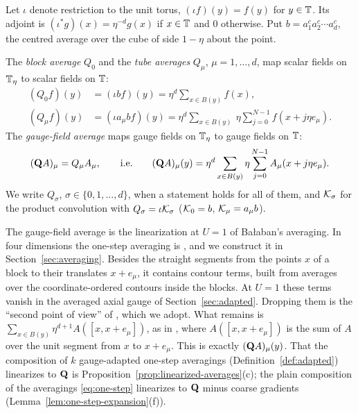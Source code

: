 Let $\iota$ denote restriction to the unit torus, $(\iota f)(y)=f(y)$ for $y\in\mathbb T$. Its adjoint is $(\iota^*g)(x)=\eta^{-d}g(x)$ if $x\in\mathbb T$ and $0$ otherwise. Put $b=a^c_1a^c_2\cdots a^c_d$, the centred average over the cube of side $1-\eta$ about the point.

\begin{definition}\label{def:averages}
The \emph{block average} $Q_0$ and the \emph{tube averages} $Q_\mu$, $\mu=1,\dots,d$, map scalar fields on $\mathbb T_\eta$ to scalar fields on $\mathbb T$:
\begin{align*}
(Q_0f)(y)&=(\iota bf)(y)=\eta^d\sum_{x\in B(y)}f(x),\\
(Q_\mu f)(y)&=(\iota a_\mu bf)(y)=\eta^d\sum_{x\in B(y)}\ \eta\sum_{j=0}^{N-1}f(x+j\eta e_\mu).
\end{align*}
The \emph{gauge-field average} maps gauge fields on $\mathbb T_\eta$ to gauge fields on $\mathbb T$:
\[
(\mathbf Q A)_\mu=Q_\mu A_\mu,\qquad\text{i.e.}\qquad (\mathbf Q A)_\mu(y)=\eta^d\sum_{x\in B(y)}\eta\sum_{j=0}^{N-1}A_\mu(x+j\eta e_\mu).
\]
We write $Q_\sigma$, $\sigma\in\{0,1,\dots,d\}$, when a statement holds for all of them, and $\mathcal K_\sigma$ for the product convolution with $Q_\sigma=\iota\mathcal K_\sigma$ ($\mathcal K_0=b$, $\mathcal K_\mu=a_\mu b$).
\end{definition}

The gauge-field average is the linearization at $U=1$ of Ba\l aban's averaging. In four dimensions the one-step averaging is \cite[(0.12)]{BalYM4I}, and we construct it in Section~\ref{sec:averaging}. Besides the straight segments from the points $x$ of a block to their translates $x+e_\mu$, it contains contour terms, built from averages over the coordinate-ordered contours inside the blocks. At $U=1$ these terms vanish in the averaged axial gauge of Section~\ref{sec:adapted}. Dropping them is the ``second point of view'' of \cite[(1.13)]{BalPropI}, which we adopt. What remains is $\sum_{x\in B(y)}\eta^{d+1}A([x,x+e_\mu])$, as in \cite[(1.11), (1.18)]{BalPropI}, where $A([x,x+e_\mu])$ is the sum of $A$ over the unit segment from $x$ to $x+e_\mu$. This is exactly $(\mathbf Q A)_\mu(y)$. That the composition of $k$ gauge-adapted one-step averagings (Definition~\ref{def:adapted}) linearizes to $\mathbf Q$ is Proposition~\ref{prop:linearized-averages}(c); the plain composition of the averagings \eqref{eq:one-step} linearizes to $\mathbf Q$ minus coarse gradients (Lemma~\ref{lem:one-step-expansion}(f)).

